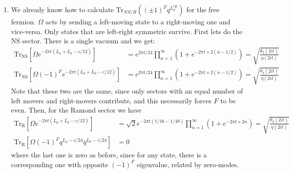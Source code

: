 \documentclass[11pt]{article}
\begin{document}
\begin{enumerate}
	\item We already know how to calculate $\mathrm{Tr}_{NS/R} ( (\pm1)^F q^{L_0^{cyl}})$ for the free fermion. $\Omega$ acts by sending a left-moving state to a right-moving one and vice-versa. Only states that are left-right symmetric survive. First lets do the NS sector. There is a single vacuum and we get:
	\[
	\begin{aligned}
		\mathrm{Tr_{NS}} [ \Omega e^{-2\pi t(L_0 + \bar L_0 - c/12)}] &= e^{ 2 \pi t/24} \prod_{n=1}^\infty (1 + e^{- 2 \pi t \times 2 (n - 1/2)}) =  \sqrt{\frac{\theta_3 (2 i t)}{\eta(2 i t)}}\\
		\mathrm{Tr_{NS}} [ \Omega (-1)^F e^{-2\pi t(L_0 + \bar L_0 - c/12)}] &= e^{ 2 \pi t/24} \prod_{n=1}^\infty (1 + e^{- 2 \pi t \times 2 (n - 1/2)}) = \sqrt{\frac{\theta_3 (2 i t)}{\eta(2 i t)}}
	\end{aligned}
	\]
	Note that these two are the same, since only sectors with an equal number of left movers and right-movers contribute, and this necessarily forces $F$ to be even. Then, for the Ramond sector we have
	\[
	\begin{aligned}
		\mathrm{Tr_{R}} [ \Omega e^{-2\pi t(L_0 + \bar L_0 - c/12)}] &= \sqrt 2 e^{-2 \pi t (1/16-1/48)} \prod_{n=1}^\infty (1 + e^{- 2 \pi t \times 2 n}) = \sqrt{\frac{\theta_2(2 i t)}{\eta(2 i t)}}\\
		\mathrm{Tr_{R}} [ \Omega (-1)^F q^{L_0 - c/24} \bar q^{\bar L_0 - \bar c/24}] &= 0
	\end{aligned}
	\]
	where the last one is zero as before, since for any state, there is a corresponding one with opposite $(-1)^F$ eigenvalue, related by zero-modes. 

\end{enumerate}

\end{document}

